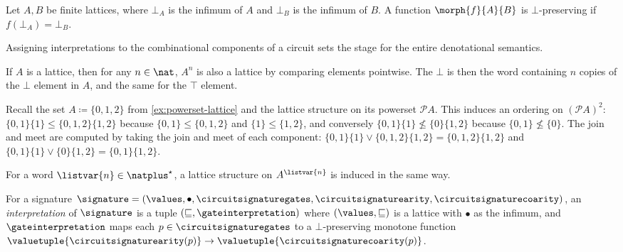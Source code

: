 \begin{definition}
    Let \(A,B\) be finite lattices, where \(\bot_A\) is the infimum of \(A\) and
    \(\bot_B\) is the infimum of \(B\).
    A function \(\morph{f}{A}{B}\) is \(\bot\)-preserving if
    \(f(\bot_A) = \bot_B\).
\end{definition}

Assigning interpretations to the combinational components of a circuit sets the
stage for the entire denotational semantics.



\begin{remark}
    If \(A\) is a lattice, then for any \(n \in \nat\), \(A^n\) is also a
    lattice by comparing elements pointwise.
    The \(\bot\) is then the word containing \(n\) copies of the \(\bot\)
    element in \(A\), and the same for the \(\top\) element.

    Recall the set \(A \coloneqq \{0,1,2\}\) from
    \cref{ex:powerset-lattice} and the lattice structure on its powerset
    \(\mathcal{P}A\).
    This induces an ordering on \((\mathcal{P}A)^2\):
    \(\{0,1\}\{1\} \leq \{0,1,2\}\{1,2\}\) because \(\{0,1\} \leq \{0,1,2\}\)
    and \(\{1\} \leq \{1,2\}\), and conversely
    \(\{0,1\}\{1\} \not\leq \{0\}\{1,2\}\) because \(\{0,1\} \not\leq \{0\}\).
    The join and meet are computed by taking the join and meet of each
    component: \(
    \{0,1\}\{1\} \vee \{0,1,2\}\{1,2\} = \{0,1,2\}\{1,2\}
    \) and \(
    \{0,1\}\{1\} \vee \{0\}\{1,2\} = \{0,1\}\{1,2\}
    \).

    For a word \(\listvar{n} \in \natplus^\star\), a lattice
    structure on \(A^{\listvar{n}}\) is induced in the same way.
\end{remark}

\begin{definition}[Interpretation]
    For a signature \(
    \signature = (
    \values, \bullet, \circuitsignaturegates, \circuitsignaturearity,
    \circuitsignaturecoarity
    )\), an \emph{interpretation} of
    \(\signature\) is a tuple \((\sqsubseteq, \gateinterpretation)\) where
    \((\values, \sqsubseteq)\) is a lattice with \(\bullet\) as the
    infimum, and \(\gateinterpretation\) maps each
    \(p \in \circuitsignaturegates\) to a \(\bot\)-preserving monotone function
    \(
    \valuetuple{\circuitsignaturearity(p)}
    \to
    \valuetuple{\circuitsignaturecoarity(p)}
    \).
\end{definition}

